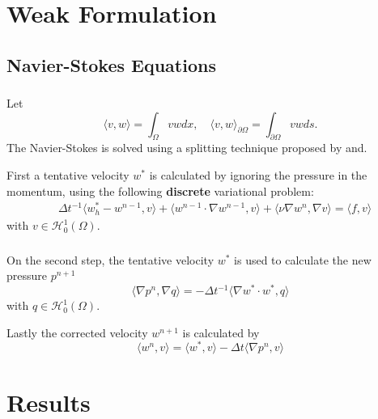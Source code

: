 \documentclass{beamer}
\theoremstyle{definition}
\theoremstyle{remark}
\theoremstyle{example}
\newif\ifinsection
\newif\ifinsubsection
\let\oldsection\section
\renewcommand{\section}{
  \global\insectiontrue
  \global\insubsectionfalse
  \oldsection}
\let\oldsubsection\subsection
\renewcommand{\subsection}{
  \global\insubsectiontrue
  \oldsubsection}
\newcommand {\aframe}[1] {
  \begin{frame}
    \ifinsection\frametitle{\secname}\fi
    \ifinsubsection\framesubtitle{\subsecname}\fi
  #1
  \end{frame}
}
\begin{document}
\section{Weak Formulation}


\subsection{Navier-Stokes Equations}
\aframe{Let
  \begin{equation*}
    \langle v, w \rangle = \int_{\Omega} vw dx, \quad
    \langle v, w \rangle_{\partial \Omega} = \int_{\partial \Omega} vw ds.
  \end{equation*}
  The Navier-Stokes is solved using a splitting technique proposed
  by\textcite{chorin1968} and\textcite{temam1969}. \vspace{0.5cm} \pause

  First a tentative velocity $w^{*}$ is calculated by ignoring the pressure in
  the momentum, using the following \textbf{discrete} variational problem:
  \begin{align*}
    &\Delta t^{-1}\langle w^*_h-w^{n-1}, v\rangle +
      \langle w^{n-1}\cdot\nabla w^{n-1}, v\rangle +
      \langle\nu\nabla w^{n},\nabla v\rangle=\langle f,v\rangle
  \end{align*}
  with $v \in \mathcal{H}_{0}^{1}(\Omega)$. }

\aframe{On the second step, the tentative velocity $w^{*}$ is used to calculate
  the new pressure $p^{n + 1}$
  \begin{equation*}
    \langle \nabla p^{n},\nabla q\rangle = -\Delta t^{-1}\langle\nabla
    w^*\cdot w^*, q\rangle
  \end{equation*}
  with $q \in \mathcal{H}_{0}^{1}(\Omega)$. \vspace{0.5cm} \pause

  Lastly the corrected velocity $w^{n+1}$ is calculated by
  \begin{equation*}
    \langle w^{n}, v \rangle = \langle w^{*}, v \rangle - \Delta t
    \langle \nabla p^n, v \rangle
  \end{equation*}
}


\section{Results}
\end{document}
